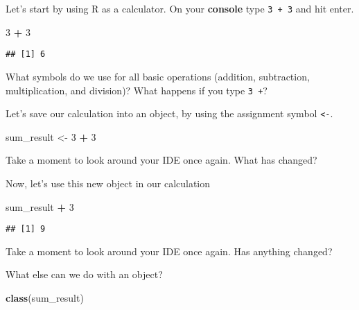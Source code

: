 \documentclass[]{book}
\newenvironment{Shaded}{\begin{snugshade}}{\end{snugshade}}
\newcommand{\DecValTok}[1]{\textcolor[rgb]{0.00,0.00,0.81}{#1}}
\newcommand{\KeywordTok}[1]{\textcolor[rgb]{0.13,0.29,0.53}{\textbf{#1}}}
\newcommand{\NormalTok}[1]{#1}
\newcommand{\OperatorTok}[1]{\textcolor[rgb]{0.81,0.36,0.00}{\textbf{#1}}}
\newcommand{\StringTok}[1]{\textcolor[rgb]{0.31,0.60,0.02}{#1}}
\begin{document}
Let's start by using R as a calculator. On your \textbf{console} type \texttt{3\ +\ 3} and hit enter.

\begin{Shaded}
\begin{Highlighting}[]
\DecValTok{3} \OperatorTok{+}\StringTok{ }\DecValTok{3}
\end{Highlighting}
\end{Shaded}

\begin{verbatim}
## [1] 6
\end{verbatim}

\leavevmode\hypertarget{question}{}%
What symbols do we use for all basic operations (addition, subtraction, multiplication, and division)?
What happens if you type \texttt{3\ +}?

Let's save our calculation into an object, by using the assignment symbol \texttt{\textless{}-}.

\begin{Shaded}
\begin{Highlighting}[]
\NormalTok{sum_result <-}\StringTok{ }\DecValTok{3} \OperatorTok{+}\StringTok{ }\DecValTok{3}
\end{Highlighting}
\end{Shaded}

\leavevmode\hypertarget{question}{}%
Take a moment to look around your IDE once again. What has changed?

Now, let's use this new object in our calculation

\begin{Shaded}
\begin{Highlighting}[]
\NormalTok{sum_result }\OperatorTok{+}\StringTok{ }\DecValTok{3}
\end{Highlighting}
\end{Shaded}

\begin{verbatim}
## [1] 9
\end{verbatim}

\leavevmode\hypertarget{question}{}%
Take a moment to look around your IDE once again. Has anything changed?

What else can we do with an object?

\begin{Shaded}
\begin{Highlighting}[]
\KeywordTok{class}\NormalTok{(sum_result)}
\end{Highlighting}
\end{Shaded}
\end{document}
